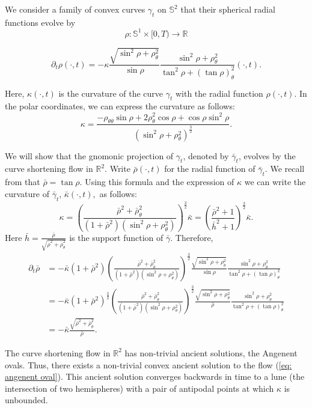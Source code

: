 \documentclass{amsart}
\begin{document}
\begin{example}
We consider a family of convex curves $\gamma_t$ on $\mathbb{S}^2$ that their spherical radial functions evolve by
\[\rho:\mathbb{S}^1\times[0,T)\to \mathbb{R}\]

\begin{equation}\label{eq: angenent oval}
\partial_t\rho(\cdot,t)=-\kappa \frac{\sqrt{\sin^2\rho+\rho_{\theta}^2}}{\sin\rho}\frac{\sin^2\rho+\rho_{\theta}^2}{\tan^2\rho+(\tan\rho)_{\theta}^2}(\cdot,t).
\end{equation}

Here, $\kappa(\cdot,t)$ is the curvature of the curve $\gamma_t$ with the radial function $\rho(\cdot,t).$ 
In the polar coordinates, we can express the curvature as follows:
\[\kappa=\frac{-\rho_{\theta\theta}\sin\rho+2\rho_\theta^2\cos\rho+\cos\rho\sin^2\rho}{(\sin^2\rho+\rho_{\theta}^2)^{\frac{3}{2}}}.\]

We will show that the gnomonic projection of $\gamma_t$, denoted by $\bar{\gamma}_t$, evolves by the curve shortening flow in $\mathbb{R}^2.$ Write $\bar{\rho}(\cdot,t)$ for the radial function of $\bar{\gamma}_t$. We recall from \cite[page 8]{besau2014spherical} that
$\bar{\rho}=\tan\rho.$ Using this formula and the expression of $\kappa$ we can write the curvature of $\bar{\gamma}_t$,  $\bar{\kappa}(\cdot,t),$ as follows:
\[\kappa=\left(\frac{\bar{\rho}^2+\bar{\rho}_{\theta}^2}{(1+\bar{\rho}^2)(\sin^2\rho+\rho_{\theta}^2)}\right)^{\frac{3}{2}}\bar{\kappa}=\left(\frac{\bar{\rho}^2+1}{\bar{h}^2+1}\right)^{\frac{3}{2}}\bar{\kappa}.\]
Here $\bar{h}=\frac{\bar{\rho}}{\sqrt{\bar{\rho}^2+\bar{\rho}_{\theta}^2}}$ is the support function of $\bar{\gamma}.$
Therefore, 
\begin{align*}
\partial_t\bar{\rho}&=-\bar{\kappa}(1+\bar{\rho}^2)\left(\frac{\bar{\rho}^2+\bar{\rho}_{\theta}^2}{(1+\bar{\rho}^2)(\sin^2\rho+\rho_{\theta}^2)}\right)^{\frac{3}{2}}\frac{\sqrt{\sin^2\rho+\rho_{\theta}^2}}{\sin\rho}\frac{\sin^2\rho+\rho_{\theta}^2}{\tan^2\rho+(\tan\rho)_{\theta}^2}\\
&=-\bar{\kappa}(1+\bar{\rho}^2)^{\frac{3}{2}}\left(\frac{\bar{\rho}^2+\bar{\rho}_{\theta}^2}{(1+\bar{\rho}^2)(\sin^2\rho+\rho_{\theta}^2)}\right)^{\frac{3}{2}}\frac{\sqrt{\sin^2\rho+\rho_{\theta}^2}}{\bar{\rho}}\frac{\sin^2\rho+\rho_{\theta}^2}{\tan^2\rho+(\tan\rho)_{\theta}^2}\\
&=-\bar{\kappa}\frac{\sqrt{\bar{\rho}^2+\bar{\rho}_{\theta}^2}}{\bar{\rho}}.
\end{align*}

The curve shortening flow in $\mathbb{R}^2$ has non-trivial ancient solutions, the Angenent ovals. Thus, there exists a non-trivial convex ancient solution to the flow (\ref{eq: angenent oval}). This ancient solution converges backwards in time to a lune (the intersection of two hemispheres) with a pair of antipodal points at which \(\kappa\) is unbounded. 
\end{example}
\end{document}
